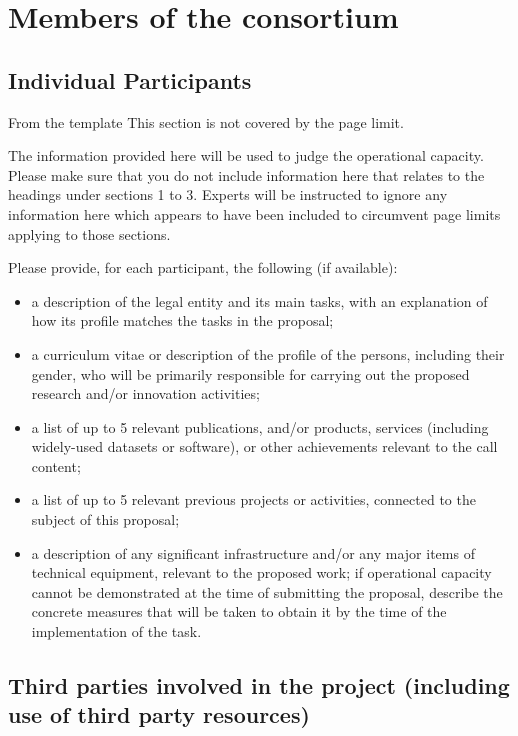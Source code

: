 \chapter{Members of the consortium}

\section{Individual Participants}\label{sec:partners}

\begin{todo}{From the template}
This section is not covered by the page limit.

The information provided here will be used to judge the operational capacity. Please make sure that you do not include information here that relates to the headings under sections 1 to 3. Experts will be instructed to ignore any information here which appears to have been included to circumvent page limits applying to those sections.

Please provide, for each participant, the following (if available):
\begin{itemize}
\item a description of the legal entity and its main tasks, with an explanation of how its profile matches the tasks in the proposal;
\item a curriculum vitae or description of the profile of the persons, including their gender, who will be primarily responsible for carrying out the proposed research and/or innovation activities;
\item a list of up to 5 relevant publications, and/or products, services (including widely-used datasets or software), or other achievements relevant to the  call content;
\item a list of up to 5 relevant previous projects or activities, connected to the subject of this proposal;
\item a description of any significant infrastructure and/or any major items of technical equipment, relevant to the proposed work;
if operational capacity cannot be demonstrated at the time of submitting the proposal, describe the concrete measures that will be taken to obtain it by the time of the implementation of the task.
\end{itemize}
\end{todo}

\newpage
\newpage
\newpage
\newpage
\newpage
\newpage
\newpage
\newpage
\newpage
\newpage
\newpage
\newpage
\newpage
\newpage
\newpage
\newpage
\newpage
\newpage
\newpage
\newpage
\newpage
\newpage
\newpage
\newpage
\newpage
\newpage

\section{Third parties involved in the project (including use of third party resources)}

